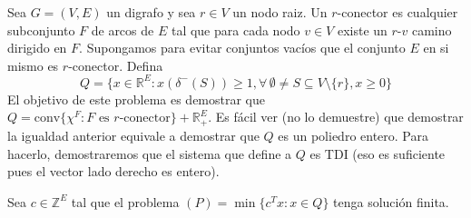 \documentclass{article}
\newcommand{\RR}{\mathbb R}
\newcommand{\ZZ}{\mathbb Z}
\theoremstyle{plain}
\theoremstyle{definition}
\theoremstyle{Azul}
\begin{document}
Sea $G=(V,E)$ un digrafo y sea $r\in V$ un nodo raiz. Un $r$-conector es cualquier subconjunto $F$ de arcos de $E$ tal que para cada nodo $v\in V$ existe un $r$-$v$ camino dirigido en $F$. Supongamos para evitar conjuntos vacíos que el conjunto $E$ en si mismo es $r$-conector. Defina
$$Q=\{x\in \RR^E\colon x(\delta^-(S))\geq 1, \forall\, \emptyset \neq S\subseteq V\setminus \{r\}, x\geq 0\}$$
El objetivo de este problema es demostrar que $Q=\text{conv}\{\chi^F\colon F\text{ es $r$-conector}\}+\RR_+^E$. Es fácil ver (no lo demuestre) que demostrar la igualdad anterior equivale a demostrar que $Q$ es un poliedro entero. Para hacerlo, demostraremos que el sistema que define a $Q$ es TDI (eso es suficiente pues el vector lado derecho es entero).

Sea $c\in \ZZ^E$ tal que el problema $(P)=\min \{c^Tx\colon x\in Q\}$ tenga solución finita. 
\end{document}

